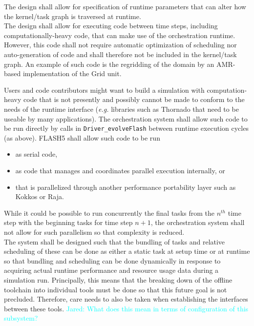 \documentclass{article}
\newcommand{\Jared}[1]          {\textcolor{cyan}{Jared: #1}}
\begin{document}
The design shall allow for specification of runtime parameters that can alter
how the kernel/task graph is traversed at runtime.\\

The design shall allow for executing code between time steps, including
computationally-heavy code, that can make use of the orchestration runtime.
However, this code shall not require automatic optimization of scheduling nor
auto-generation of code and shall therefore not be included in the kernel/task
graph.  An example of such code is the regridding of the domain by an AMR-based
implementation of the Grid unit.\\

\begin{req}
Users and code contributors might want to build a simulation with
computation-heavy code that is not presently and possibly cannot be made to
conform to the needs of the runtime interface (\textit{e.g.} libraries such as
Thornado that need to be useable by many applications).  The orchestration
system shall allow such code to be run directly by calls in
\texttt{Driver\_evolveFlash} between runtime execution cycles (as above).
FLASH5 shall allow such code to be run
\begin{itemize}
\item{as serial code,}
\item{as code that manages and coordinates parallel execution internally, or}
\item{that is parallelized through another performance portability layer such as
Kokkos or Raja.}
\end{itemize}
\end{req}

While it could be possible to run concurrently the final tasks from the $n^{th}$
time step with the beginning tasks for time step $n+1$, the orchestration
system shall not allow for such parallelism so that complexity is reduced.\\ 

The system shall be designed such that the bundling of tasks and relative
scheduling of these can be done as either a static task at setup time or at
runtime so that bundling and scheduling can be done dynamically in response to
acquiring actual runtime performance and resource usage data during a simulation
run.  Principally, this means that the breaking down of the offline toolchain into
individual tools must be done so that this future goal is not precluded.
Therefore, care needs to also be taken when establishing the interfaces between
these tools.  \Jared{What does this mean in terms of configuration of this
subsystem?}\\
\end{document}
